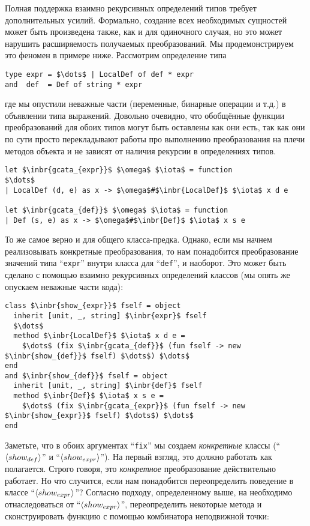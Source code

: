 Полная поддержка взаимно рекурсивных определений типов требует дополнительных усилий.
Формально, создание всех необходимых сущностей может быть произведена также, как и для 
одиночного случая, но это может нарушить расширяемость получаемых преобразований.
Мы продемонстрируем это феномен в примере ниже. Рассмотрим определение типа


\begin{lstlisting}
type expr = $\dots$ | LocalDef of def * expr
and  def  = Def of string * expr
\end{lstlisting}

где мы опустили неважные части (переменные, бинарные операции и т.д.) в объявлении типа выражений. Довольно очевидно, что обобщённые функции преобразований для обоих типов могут  быть оставлены как они есть, так как они по сути просто перекладывают работы про выполнению преобразования на плечи методов объекта и не зависят от наличия рекурсии в определениях типов.

\begin{lstlisting}
let $\inbr{gcata_{expr}}$ $\omega$ $\iota$ = function
$\dots$
| LocalDef (d, e) as x -> $\omega$#$\inbr{LocalDef}$ $\iota$ x d e

let $\inbr{gcata_{def}}$ $\omega$ $\iota$ = function
| Def (s, e) as x -> $\omega$#$\inbr{Def}$ $\iota$ x s e
\end{lstlisting}

То же самое верно и для общего класса-предка. Однако, если мы начнем реализовывать конкретные преобразования, то нам понадобится преобразование значений 
типа ``\lstinline{expr}'' внутри класса для ``\lstinline{def}'', и наоборот. Это может быть сделано с помощью взаимно рекурсивных определений классов (мы опять же опускаем неважные части кода):

\begin{lstlisting}
class $\inbr{show_{expr}}$ fself = object 
  inherit [unit, _, string] $\inbr{expr}$ fself
  $\dots$
  method $\inbr{LocalDef}$ $\iota$ x d e =
    $\dots$ (fix $\inbr{gcata_{def}}$ (fun fself -> new $\inbr{show_{def}}$ fself) $\dots$) $\dots$
end
and $\inbr{show_{def}}$ fself = object 
  inherit [unit, _, string] $\inbr{def}$ fself
  method $\inbr{Def}$ $\iota$ x s e =
    $\dots$ (fix $\inbr{gcata_{expr}}$ (fun fself -> new $\inbr{show_{expr}}$ fself) $\dots$) $\dots$
end
\end{lstlisting}

Заметьте, что в обоих аргументах ``\lstinline{fix}'' мы создаем \emph{конкретные} классы  (``$\left<show_{def}\right>$'' и ``$\left<show_{expr}\right>$''). На первый взгляд, это должно работать как полагается. Строго говоря, это \emph{конкретное} преобразование действительно работает.
Но что случится, если нам понадобится переопределить поведение в классе 
 ``$\left<show_{expr}\right>$''? Согласно подходу, определенному выше, на необходимо отнаследоваться от ``$\left<show_{expr}\right>$'', переопределить некоторые метода и сконструировать функцию с помощью комбинатора неподвижной точки:

